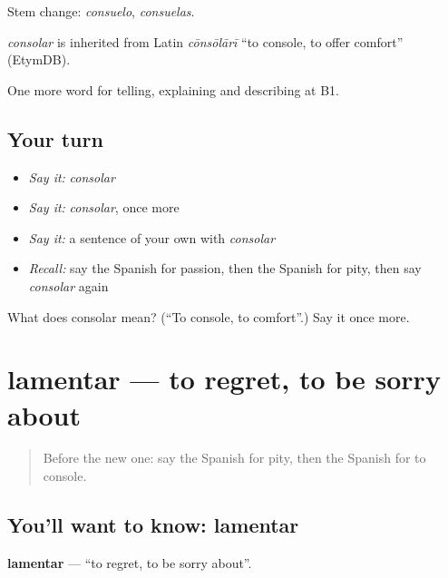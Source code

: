 Stem change: \emph{consuelo}, \emph{consuelas}.

\begin{cousinweb}
\emph{consolar} is inherited from Latin \emph{cōnsōlārī} \textquotedblleft{}to console, to offer comfort\textquotedblright{} (EtymDB).
\end{cousinweb}

\begin{grammarlens}[title={What you've built}]
One more word for telling, explaining and describing at B1.
\end{grammarlens}

\subsection*{Your turn}
\begin{itemize}
\raggedright
  \item \emph{Say it:} \emph{consolar}
  \item \emph{Say it:} \emph{consolar}, once more
  \item \emph{Say it:} a sentence of your own with \emph{consolar}
  \item \emph{Recall:} say the Spanish for passion, then the Spanish for pity, then say \emph{consolar} again
\end{itemize}

\begin{tcolorbox}[breakable,colback=teal!4,colframe=teal!35!black,title={Before you move on}]
What does consolar mean? (\textquotedblleft{}To console, to comfort\textquotedblright{}.) Say it once more.
\end{tcolorbox}
\section[lamentar]{lamentar — to regret, to be sorry about}

\label{lesson:ES-C716-lamentar}



\begin{quote}
Before the new one: say the Spanish for pity, then the Spanish for to console.
\end{quote}

\subsection*{You'll want to know: lamentar}
\textbf{lamentar} — \textquotedblleft{}to regret, to be sorry about\textquotedblright{}.


